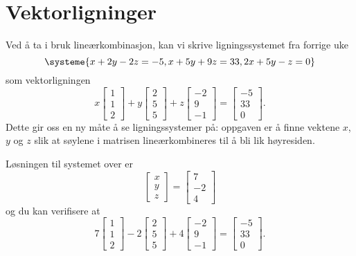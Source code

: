 \section*{Vektorligninger}
Ved å ta i bruk lineærkombinasjon, kan vi skrive ligningssystemet fra forrige uke
\[
\systeme{
	x + 2y - 2z = -5,
	x + 5y + 9z = 33,
	2x + 5y -  z = 0
}
\]
som vektorligningen
\begin{equation*}
x
\begin{bmatrix}
1     \\
1   \\
2   
\end{bmatrix}
+
y
\begin{bmatrix}
2   \\
5   \\
5    
\end{bmatrix}
+
z
\begin{bmatrix}
-2   \\
9 \\
-1 
\end{bmatrix}
=
\begin{bmatrix}
-5   \\
33 \\
0 
\end{bmatrix}.
\end{equation*}
Dette gir oss en ny måte å se ligningssystemer på: oppgaven er å finne vektene $x$, $y$  og $z$ slik at s{\o}ylene i matrisen line{\ae}rkombineres til {\aa} bli lik h{\o}yresiden. 
\begin{ex}
	Løsningen til systemet over er
	\begin{equation*}
	\begin{bmatrix}
	x  \\
	y \\
	z
	\end{bmatrix}
	=
	\begin{bmatrix}
	7  \\
	-2 \\
	4
	\end{bmatrix}
	\end{equation*}
	og du kan verifisere at 
	\begin{equation*}
	7
	\begin{bmatrix}
	1     \\
	1   \\
	2   
	\end{bmatrix}
	-2
	\begin{bmatrix}
	2   \\
	5   \\
	5    
	\end{bmatrix}
	+
	4
	\begin{bmatrix}
	-2   \\
	9 \\
	-1 
	\end{bmatrix}
	=
	\begin{bmatrix}
	-5   \\
	33 \\
	0 
	\end{bmatrix}.
	\end{equation*}
\end{ex}

